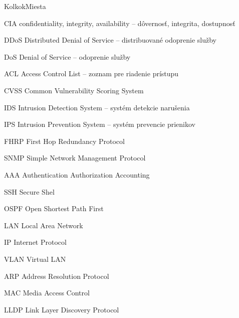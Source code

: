 \begin{seznamzkratek}{KolkokMiesta}

		{CIA} %
		{confidentiality, integrity, availability -- dôvernosť, integrita, dostupnosť} %

		{DDoS} %
		{Distributed Denial of Service -- distribuované odoprenie služby} %
	
	{DoS} %
	{Denial of Service -- odoprenie služby} %

		{ACL} %
		{Access Control List -- zoznam pre riadenie prístupu} %

		{CVSS} %
		{Common Vulnerability Scoring System} %
		
		{IDS} %
		{Intrusion Detection System -- systém detekcie narušenia} %

		{IPS} %
		{Intrusion Prevention System -- systém prevencie prienikov} %

		{FHRP} %
		{First Hop Redundancy Protocol} %

		{SNMP} %
		{Simple Network Management Protocol} %
	
	{AAA} %
	{Authentication Authorization Accounting} %
	
	{SSH} %
	{Secure Shel} %
	
	{OSPF} %
	{Open Shortest Path First} %

	{LAN} %
	{Local Area Network} %

	{IP} %
	{Internet Protocol} %
	
	{VLAN} %
	{Virtual LAN} %
	
	{ARP} %
	{Address Resolution Protocol} %

	{MAC} %
	{Media Access Control} %
	
	{LLDP} %
	{Link Layer Discovery Protocol} %

\end{seznamzkratek}
